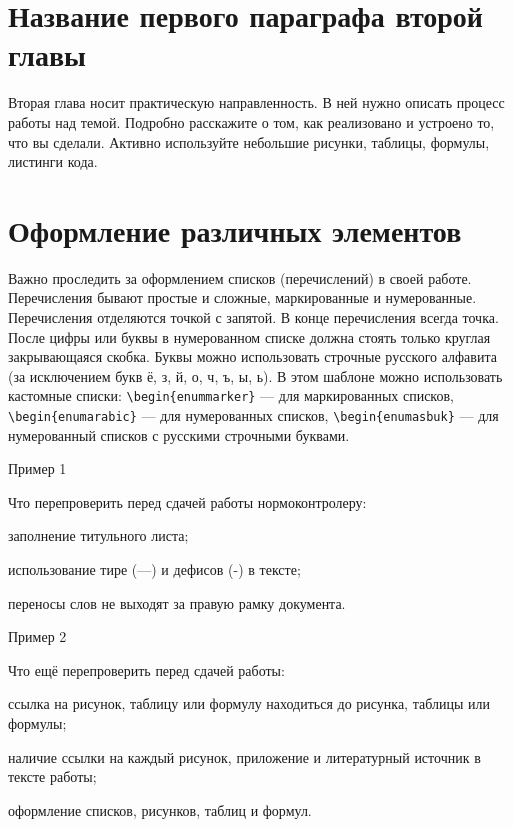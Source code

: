 \documentclass{report}
\begin{document}
\section{Название первого параграфа второй главы}

Вторая глава носит практическую направленность. В ней нужно описать процесс работы над темой. Подробно расскажите о том, как реализовано и устроено то, что вы сделали. Активно используйте небольшие рисунки, таблицы, формулы, листинги кода. 

\section{Оформление различных элементов}

Важно проследить за оформлением списков (перечислений) в своей работе. Перечисления бывают простые и сложные, маркированные и нумерованные. Перечисления отделяются точкой с запятой. В конце перечисления всегда точка. После цифры или буквы в нумерованном списке должна стоять только круглая закрывающаяся скобка. Буквы можно использовать строчные русского алфавита (за исключением букв ё, з, й, о, ч, ъ, ы, ь).
В этом шаблоне можно использовать кастомные списки: \verb|\begin{enummarker}| --- для маркированных списков, \break \verb|\begin{enumarabic}| --- для нумерованных списков, \verb|\begin{enumasbuk}| --- для нумерованный списков с русскими строчными буквами.

Пример 1

Что перепроверить перед сдачей работы нормоконтролеру:
\begin{enummarker}
\item заполнение титульного листа;
\item использование тире (---) и дефисов (-) в тексте;
\item переносы слов не выходят за правую рамку документа. 
\end{enummarker}

Пример 2

Что ещё перепроверить перед сдачей работы:
\begin{enumarabic}
  \item ссылка на рисунок, таблицу или формулу находиться до рисунка, таблицы или формулы;
  \item наличие ссылки на каждый рисунок, приложение и литературный источник в тексте работы;
  \item оформление списков, рисунков, таблиц и формул.
\end{enumarabic}
\end{document}

